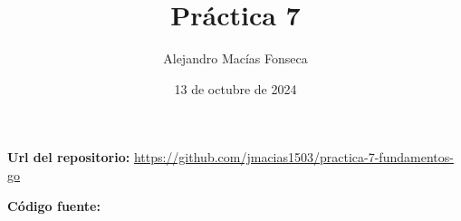 \documentclass{article}
\title{Pr\'actica 7}
\author{Alejandro Mac\'ias Fonseca}
\date{13 de octubre de 2024}
\begin{document}
\maketitle
\noindent \textbf{Url del repositorio:} \url{https://github.com/jmacias1503/practica-7-fundamentos-go}

\noindent \textbf{C\'odigo fuente:}

\end{document}
